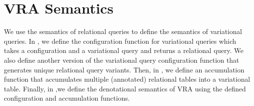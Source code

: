 \section{VRA Semantics }
\label{sec:vrasem}


We use the semantics of relational queries to define the semantics of 
variational queries. In , we define the configuration function
for variational queries which takes a configuration and a variational query
and returns a relational query. We also define another version of the
variational query configuration function that generates unique relational
query variants. Then, in , we define an accumulation function that accumulates
multiple (annotated) relational tables into a variational table. Finally, in ,we  
define the denotational semantics of VRA using the defined configuration and
accumulation functions.
%


